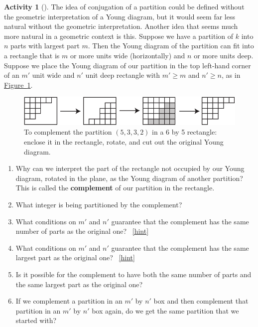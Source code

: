 \documentclass[10pt,]{book}
\newcommand{\terminology}[1]{\textbf{#1}}
\theoremstyle{plain}
\theoremstyle{definition}
\theoremstyle{definition}
\theoremstyle{definition}
\newtheorem{activity}[project]{Activity}
\numberwithin{equation}{chapter}
\begin{document}
\begin{activity}[]\label{activity-301}
\hypertarget{p-1519}{}%
The idea of conjugation of a partition could be defined without the geometric interpretation of a Young diagram, but it would seem far less natural without the geometric interpretation. Another idea that seems much more natural in a geometric context is this. Suppose we have a partition of \(k\) into \(n\) parts with largest part \(m\). Then the Young diagram of the partition can fit into a rectangle that is \(m\) or more units wide (horizontally) and \(n\) or more units deep. Suppose we place the Young diagram of our partition in the top left-hand corner of an \(m'\) unit wide and \(n'\) unit deep rectangle with \(m'\ge m\) and \(n' \ge n\), as in \hyperref[complementpartition]{Figure~\ref{complementpartition}}.%
\begin{figure}
\centering
\includegraphics[width=0.7\linewidth]{images/complementpartition}
\caption{To complement the partition \((5,3,3,2)\) in a 6 by 5 rectangle: enclose it in the rectangle, rotate, and cut out the original Young diagram.\label{complementpartition}}
\end{figure}
\begin{enumerate}[font=\bfseries,label=(\alph*),ref=\alph*]
\item\label{task-265} \hypertarget{p-1520}{}%
Why can we interpret the part of the rectangle not occupied by our Young diagram, rotated in the plane, as the Young diagram of another partition? This is called the \terminology{complement} of our partition in the rectangle.%
\item\label{task-266} \hypertarget{p-1522}{}%
What integer is being partitioned by the complement?%
\item\label{task-267} \hypertarget{p-1524}{}%
What conditions on \(m'\) and \(n'\) guarantee that the complement has the same number of parts as the original one?%
~\hfill{\tiny\hyperlink{a-308.c}{[hint]}\hypertarget{q-308.c}{}}\item\label{task-268} \hypertarget{p-1527}{}%
What conditions on \(m'\) and \(n'\) guarantee that the complement has the same largest part as the original one?%
~\hfill{\tiny\hyperlink{a-308.d}{[hint]}\hypertarget{q-308.d}{}}\item\label{task-269} \hypertarget{p-1530}{}%
Is it possible for the complement to have both the same number of parts and the same largest part as the original one?%
\item\label{task-270} \hypertarget{p-1532}{}%
If we complement a partition in an \(m'\) by \(n'\) box and then complement that partition in an \(m'\) by \(n'\) box again, do we get the same partition that we started with?%
\end{enumerate}
\end{activity}
\end{document}
